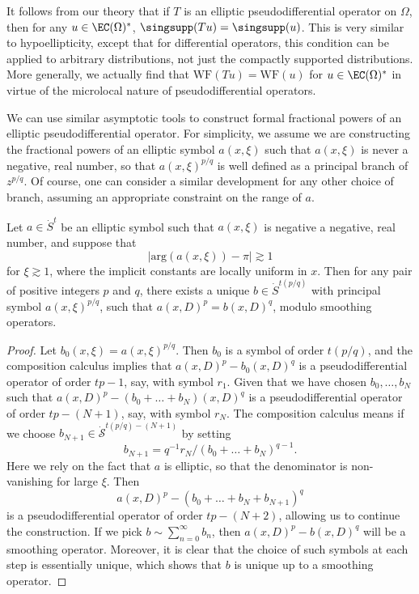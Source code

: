 It follows from our theory that if $T$ is an elliptic pseudodifferential operator on $\Omega$, then for any $u \in \EC(\Omega)^*$, $\singsupp(Tu) = \singsupp(u)$. This is very similar to hypoellipticity, except that for differential operators, this condition can be applied to arbitrary distributions, not just the compactly supported distributions. More generally, we actually find that $\text{WF}(Tu) = \text{WF}(u)$ for $u \in \EC(\Omega)^*$ in virtue of the microlocal nature of pseudodifferential operators.

We can use similar asymptotic tools to construct formal fractional powers of an elliptic pseudodifferential operator. For simplicity, we assume we are constructing the fractional powers of an elliptic symbol $a(x,\xi)$ such that $a(x,\xi)$ is never a negative, real number, so that $a(x,\xi)^{p/q}$ is well defined as a principal branch of $z^{p/q}$. Of course, one can consider a similar development for any other choice of branch, assuming an appropriate constraint on the range of $a$.

\begin{theorem}
    Let $a \in \dot{S}^t$ be an elliptic symbol such that $a(x,\xi)$ is negative a negative, real number, and suppose that
    \[ | \text{arg}(a(x,\xi)) - \pi | \gtrsim 1 \]
    for $\xi \gtrsim 1$, where the implicit constants are locally uniform in $x$. Then for any pair of positive integers $p$ and $q$, there exists a unique $b \in \dot{S}^{t(p/q)}$ with principal symbol $a(x,\xi)^{p/q}$, such that $a(x,D)^p = b(x,D)^q$, modulo smoothing operators.
\end{theorem}
\begin{proof}
    Let $b_0(x,\xi) = a(x,\xi)^{p/q}$. Then $b_0$ is a symbol of order $t(p/q)$, and the composition calculus implies that $a(x,D)^p - b_0(x,D)^q$ is a pseudodifferential operator of order $tp - 1$, say, with symbol $r_1$. Given that we have chosen $b_0,\dots,b_N$ such that $a(x,D)^p - (b_0 + \dots + b_N)(x,D)^q$ is a pseudodifferential operator of order $tp - (N+1)$, say, with symbol $r_N$. The composition calculus means if we choose $b_{N+1} \in \dot{\mathcal{S}}^{t(p/q) - (N+1)}$ by setting
    \[ b_{N+1} = q^{-1} r_N / (b_0 + \dots + b_N)^{q-1}. \]
    Here we rely on the fact that $a$ is elliptic, so that the denominator is non-vanishing for large $\xi$. Then
    \[ a(x,D)^p - (b_0 + \dots + b_N + b_{N+1})^q \]
    is a pseudodifferential operator of order $tp - (N+2)$, allowing us to continue the construction. If we pick $b \sim \sum_{n = 0}^\infty b_n$, then $a(x,D)^p - b(x,D)^q$ will be a smoothing operator. Moreover, it is clear that the choice of such symbols at each step is essentially unique, which shows that $b$ is unique up to a smoothing operator.
\end{proof}

